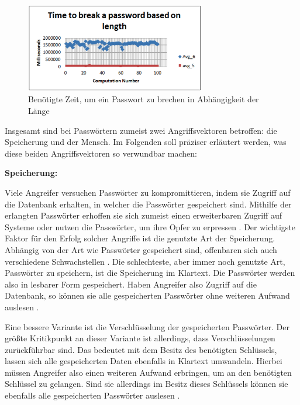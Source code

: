     \begin{figure}[H]
        \centering 
        \includegraphics[width=0.7\textwidth]{img/abbildungen/length-time.png}
        \captionsetup{format=hang}
        \caption{Benötigte Zeit, um ein Passwort zu brechen in Abhängigkeit der Länge \cite{chanda2016password}} \label{timetobreak}
    \end{figure}

    Insgesamt sind bei Passwörtern zumeist zwei Angriffsvektoren betroffen: die Speicherung und der Mensch. Im Folgenden soll präziser erläutert werden, was diese beiden Angriffsvektoren so verwundbar machen:

    \textbf{Speicherung:}

    Viele Angreifer versuchen Passwörter zu kompromittieren, indem sie Zugriff auf die Datenbank erhalten, in welcher die Passwörter gespeichert sind. Mithilfe der erlangten Passwörter erhoffen sie sich zumeist einen erweiterbaren Zugriff auf Systeme oder nutzen die Passwörter, um ihre Opfer zu erpressen \cite{boonkrong2012security}. Der wichtigste Faktor für den Erfolg solcher Angriffe ist die genutzte Art der Speicherung. Abhängig von der Art wie Passwörter gespeichert sind, offenbaren sich auch verschiedene Schwachstellen \cite{chanda2016password}.
    Die schlechteste, aber immer noch genutzte Art, Passwörter zu speichern, ist die Speicherung im Klartext. Die Passwörter werden also in lesbarer Form gespeichert. Haben Angreifer also Zugriff auf die Datenbank, so können sie alle gespeicherten Passwörter ohne weiteren Aufwand auslesen \cite{chanda2016password}.

    Eine bessere Variante ist die Verschlüsselung der gespeicherten Passwörter. Der größte Kritikpunkt an dieser Variante ist allerdings, dass Verschlüsselungen zurückführbar sind. Das bedeutet mit dem Besitz des benötigten Schlüssels, lassen sich alle gespeicherten Daten ebenfalls in Klartext umwandeln. Hierbei müssen Angreifer also einen weiteren Aufwand erbringen, um an den benötigten Schlüssel zu gelangen. Sind sie allerdings im Besitz dieses Schlüssels können sie ebenfalls alle gespeicherten Passwörter auslesen \cite{chanda2016password}. 

